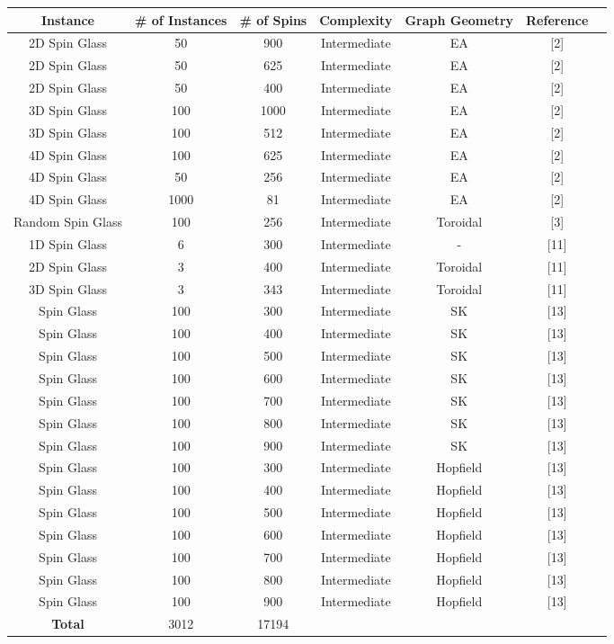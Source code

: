\documentclass{standalone}
\begin{document}
\begin{tabular}{ |c|c|c|c|c|c|c| } 
    \hline
    \textbf{Instance} & \textbf{\# of Instances} & \textbf{\# of Spins} & \textbf{Complexity} & \textbf{Graph Geometry} & \textbf{Reference}\\ 
    \hline
    2D Spin Glass & 50 & 900 & Intermediate & EA & [2] \\
    2D Spin Glass & 50 & 625 & Intermediate & EA & [2] \\
    2D Spin Glass & 50 & 400 & Intermediate & EA & [2] \\
    3D Spin Glass & 100 & 1000 & Intermediate & EA & [2] \\
    3D Spin Glass & 100 & 512 & Intermediate & EA & [2] \\
    4D Spin Glass & 100 & 625 & Intermediate & EA & [2] \\
    4D Spin Glass & 50 & 256 & Intermediate & EA & [2] \\
    4D Spin Glass & 1000 & 81 & Intermediate & EA & [2] \\
    Random Spin Glass & 100 & 256 & Intermediate & Toroidal & [3] \\
    1D Spin Glass & 6 & 300 & Intermediate & - & [11] \\
    2D Spin Glass & 3 & 400 & Intermediate & Toroidal & [11] \\
    3D Spin Glass & 3 & 343 & Intermediate & Toroidal & [11] \\
    Spin Glass & 100 & 300 & Intermediate & SK & [13] \\
    Spin Glass & 100 & 400 & Intermediate & SK & [13] \\
    Spin Glass & 100 & 500 & Intermediate & SK & [13] \\
    Spin Glass & 100 & 600 & Intermediate & SK & [13] \\
    Spin Glass & 100 & 700 & Intermediate & SK & [13] \\
    Spin Glass & 100 & 800 & Intermediate & SK & [13] \\
    Spin Glass & 100 & 900 & Intermediate & SK & [13] \\
    Spin Glass & 100 & 300 & Intermediate & Hopfield & [13] \\
    Spin Glass & 100 & 400 & Intermediate & Hopfield & [13] \\
    Spin Glass & 100 & 500 & Intermediate & Hopfield & [13] \\
    Spin Glass & 100 & 600 & Intermediate & Hopfield & [13] \\
    Spin Glass & 100 & 700 & Intermediate & Hopfield & [13] \\
    Spin Glass & 100 & 800 & Intermediate & Hopfield & [13] \\
    Spin Glass & 100 & 900 & Intermediate & Hopfield & [13] \\
     \hline
    \textbf{Total} & 3012 & 17194 & & &\\
    \hline
\end{tabular}
\end{document}

